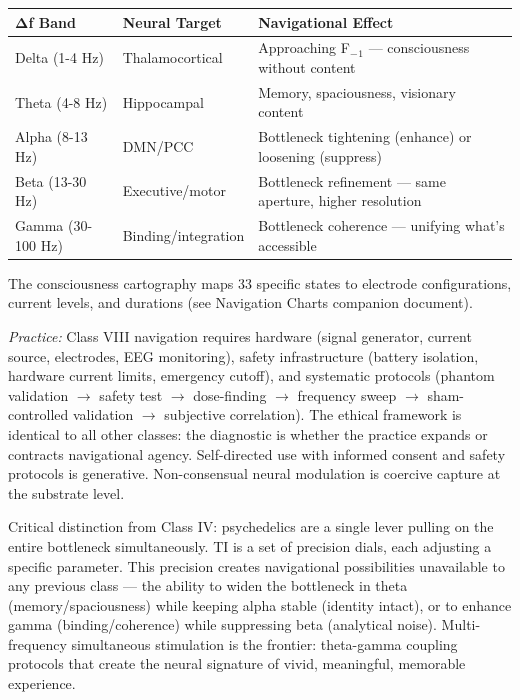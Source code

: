 \begin{longtable}{>{\raggedright\arraybackslash}p{} >{\raggedright\arraybackslash}p{} >{\raggedright\arraybackslash}p{}}
\toprule
\textbf{Δf Band} & \textbf{Neural Target} & \textbf{Navigational Effect} \\
\midrule
\endhead
Delta (1-4 Hz) & Thalamocortical & Approaching F$_{-}$$_1$ — consciousness without content \\
Theta (4-8 Hz) & Hippocampal & Memory, spaciousness, visionary content \\
Alpha (8-13 Hz) & DMN/\allowbreak PCC & Bottleneck tightening (enhance) or loosening (suppress) \\
Beta (13-30 Hz) & Executive/\allowbreak motor & Bottleneck refinement — same aperture, higher resolution \\
Gamma (30-100 Hz) & Binding/\allowbreak integration & Bottleneck coherence — unifying what's accessible \\
\bottomrule
\end{longtable}



The consciousness cartography maps 33 specific states to electrode configurations, current levels, and durations (see Navigation Charts companion document).


\textit{Practice:} Class VIII navigation requires hardware (signal generator, current source, electrodes, EEG monitoring), safety infrastructure (battery isolation, hardware current limits, emergency cutoff), and systematic protocols (phantom validation $\rightarrow$ safety test $\rightarrow$ dose-finding $\rightarrow$ frequency sweep $\rightarrow$ sham-controlled validation $\rightarrow$ subjective correlation). The ethical framework is identical to all other classes: the diagnostic is whether the practice expands or contracts navigational agency. Self-directed use with informed consent and safety protocols is generative. Non-consensual neural modulation is coercive capture at the substrate level.


Critical distinction from Class IV: psychedelics are a single lever pulling on the entire bottleneck simultaneously. TI is a set of precision dials, each adjusting a specific parameter. This precision creates navigational possibilities unavailable to any previous class — the ability to widen the bottleneck in theta (memory/\allowbreak spaciousness) while keeping alpha stable (identity intact), or to enhance gamma (binding/\allowbreak coherence) while suppressing beta (analytical noise). Multi-frequency simultaneous stimulation is the frontier: theta-gamma coupling protocols that create the neural signature of vivid, meaningful, memorable experience.


